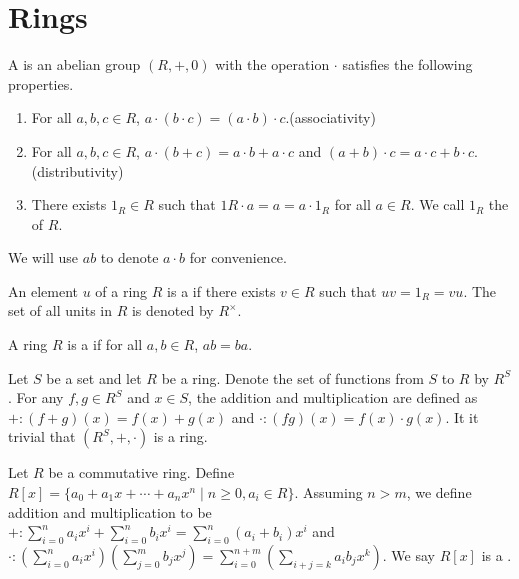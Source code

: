 \documentclass[10pt]{article}
\begin{document}
\section{Rings}
\begin{definition}
    A  is an abelian group $(R,+,0)$ with the operation $\cdot$ satisfies the following properties.
    \begin{enumerate}
        \item For all $a,b,c\in R$, $a\cdot(b\cdot c)=(a\cdot b)\cdot c$.\hfill(associativity)
        \item For all $a,b,c\in R$, $a\cdot(b+c)=a\cdot b+a\cdot c$ and $(a+b)\cdot c=a\cdot c+b\cdot c$.\hfill(distributivity)
        \item There exists ${1}_{R}\in R$ such that ${1}{R}\cdot a=a=a\cdot{1}_{R}$ for all $ a\in R$. We call ${1}_{R}$ the  of $R$.
    \end{enumerate}
\end{definition}
\begin{remark}
    We will use $ab$ to denote $a\cdot b$ for convenience.
\end{remark}
\begin{definition}
    An element $u$ of a ring $R$ is a  if there exists $v\in R$ such that $uv={1}_{R}=vu$. The set of all units in $R$ is denoted by ${R}^{\times}$.
\end{definition}
\begin{definition}
    A ring $R$ is a  if for all $a,b\in R$, $ab=ba$.
\end{definition}
\begin{example}
    Let $S$ be a set and let $R$ be a ring. Denote the set of functions from $S$ to $R$ by $R^{S}$. For any $f,g\in{R}^{S}$ and $x\in S$, the addition and multiplication are defined as $+:(f+g)(x)=f(x)+g(x)$ and $\cdot:(fg)(x)=f(x)\cdot g(x)$. It it trivial that $({R}^{S},+,\cdot)$ is a ring.
\end{example}
\begin{definition}
    Let $R$ be a commutative ring. Define $R[x]=\{{a}_{0}+{a}_{1}x+\cdots+{a}_{n}x^{n}\mid n\ge 0,{a}_{i}\in R\}$. Assuming $n>m$, we define addition and multiplication to be $+:{\sum}_{i=0}^{n}{a}_{i}{x}^{i}+{\sum}_{i=0}^{n}{b}_{i}{x}^{i}={\sum}_{i=0}^{n}({a}_{i}+{b}_{i}){x}^{i}$ and $\cdot:({\sum}_{i=0}^{n} {a}_{i}{x}^{i})({\sum}_{j=0}^{m}{b}_{j}x^{j})={\sum}_{i=0}^{n+m}({\sum}_{i+j=k}{a}_{i}{b}_{j}{x}^{k})$. We say $R[x]$ is a .
\end{definition}
\end{document}
